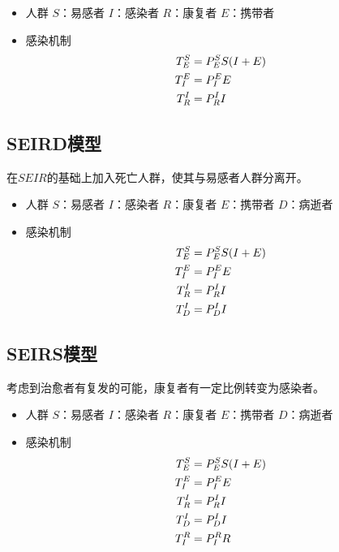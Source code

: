 \begin{itemize}
    \item 人群
          \subitem $S$：易感者
          \subitem $I$：感染者
          \subitem $R$：康复者
          \subitem $E$：携带者
    \item 感染机制
          \subitem
          \begin{align}
              T^{S}_{E}&=P^{S}_{E}S(I+E) \\
              T^{E}_{I}&=P^{E}_{I}E      \\
              T^{I}_{R}&=P^{I}_{R}I
          \end{align}
\end{itemize}
\subsection{SEIRD模型}
在$SEIR$的基础上加入死亡人群，使其与易感者人群分离开。
\begin{itemize}
    \item 人群
          \subitem $S$：易感者
          \subitem $I$：感染者
          \subitem $R$：康复者
          \subitem $E$：携带者
          \subitem $D$：病逝者
    \item 感染机制
          \subitem
          \begin{align}
              T^{S}_{E}&=P^{S}_{E}S(I+E) \\
              T^{E}_{I}&=P^{E}_{I}E      \\
              T^{I}_{R}&=P^{I}_{R}I      \\
              T^{I}_{D}&=P^{I}_{D}I
          \end{align}
\end{itemize}
\subsection{SEIRS模型}
考虑到治愈者有复发的可能，康复者有一定比例转变为感染者。
\begin{itemize}
    \item 人群
          \subitem $S$：易感者
          \subitem $I$：感染者
          \subitem $R$：康复者
          \subitem $E$：携带者
          \subitem $D$：病逝者
    \item  感染机制
          \subitem
          \begin{align}
              T^{S}_{E}&=P^{S}_{E}S(I+E) \\
              T^{E}_{I}&=P^{E}_{I}E      \\
              T^{I}_{R}&=P^{I}_{R}I      \\
              T^{I}_{D}&=P^{I}_{D}I      \\
              T^{R}_{I}&=P^{R}_{I}R
          \end{align}
\end{itemize}